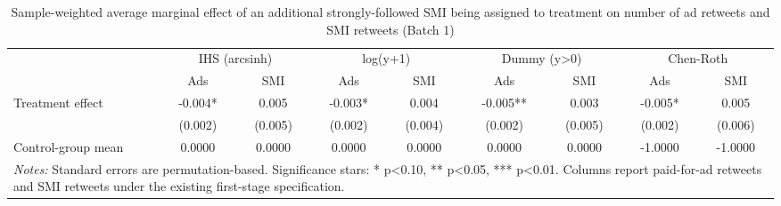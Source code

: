 \begin{table}[!htbp]
\centering
\caption{Sample-weighted average marginal effect of an additional strongly-followed SMI being assigned to treatment on number of ad retweets and SMI retweets (Batch 1)}
\begin{tabular}{lcccccccc}
\hline
 & \multicolumn{2}{c}{IHS (arcsinh)} & \multicolumn{2}{c}{log(y+1)} & \multicolumn{2}{c}{Dummy (y>0)} & \multicolumn{2}{c}{Chen-Roth} \\
 & Ads & SMI & Ads & SMI & Ads & SMI & Ads & SMI \\
\hline
Treatment effect & -0.004* & 0.005 & -0.003* & 0.004 & -0.005** & 0.003 & -0.005* & 0.005 \\
 & (0.002) & (0.005) & (0.002) & (0.004) & (0.002) & (0.005) & (0.002) & (0.006) \\
Control-group mean & 0.0000 & 0.0000 & 0.0000 & 0.0000 & 0.0000 & 0.0000 & -1.0000 & -1.0000 \\
\hline
\multicolumn{9}{l}{\parbox[t]{15.5cm}{\textit{Notes:} Standard errors are permutation-based. Significance stars: * p<0.10, ** p<0.05, *** p<0.01. Columns report paid-for-ad retweets and SMI retweets under the existing first-stage specification.}} \\
\end{tabular}
\end{table}
